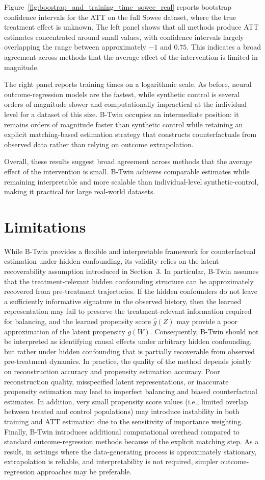 \documentclass[10pt]{article} %
\begin{document}
Figure~\ref{fig:boostrap_and_training_time_sowee_real} reports bootstrap confidence intervals for the ATT on the full Sowee dataset, where the true treatment effect is unknown. The left panel shows that all methods produce ATT estimates concentrated around small values, with confidence intervals largely overlapping the range between approximately $-1$ and $0.75$. This indicates a broad agreement across methods that the average effect of the intervention is limited in magnitude.

The right panel reports training times on a logarithmic scale. As before, neural outcome-regression models are the fastest, while synthetic control is several orders of magnitude slower and computationally impractical at the individual level for a dataset of this size. B-Twin occupies an intermediate position: it remains orders of magnitude faster than synthetic control while retaining an explicit matching-based estimation strategy that constructs counterfactuals from observed data rather than relying on outcome extrapolation.

Overall, these results suggest broad agreement across methods that the average
effect of the intervention is small. B-Twin achieves comparable
estimates while remaining interpretable and more scalable than {individual-level} synthetic-control, making it practical for
large real-world datasets.
\section{{Limitations}}
{
While B-Twin provides a flexible and interpretable framework for counterfactual estimation under hidden confounding, its validity relies on the latent recoverability assumption introduced in Section~3. In particular, B-Twin assumes that the treatment-relevant hidden confounding structure can be approximately recovered from pre-treatment trajectories. If the hidden confounders do not leave a sufficiently informative signature in the observed history, then the learned representation may fail to preserve the treatment-relevant information required for balancing, and the learned propensity score $\hat g(Z)$ may provide a poor approximation of the latent propensity $g(W)$. Consequently, B-Twin should not be interpreted as identifying causal effects under arbitrary hidden confounding, but rather under hidden confounding that is partially recoverable from observed pre-treatment dynamics.
In practice, the quality of the method depends jointly on reconstruction accuracy and propensity estimation accuracy. Poor reconstruction quality, misspecified latent representations, or inaccurate propensity estimation may lead to imperfect balancing and biased counterfactual estimates. In addition, very small propensity score values (i.e., limited overlap between treated and control populations) may introduce instability in both training and ATT estimation due to the sensitivity of importance weighting.
Finally, B-Twin introduces additional computational overhead compared to standard outcome-regression methods because of the explicit matching step. As a result, in settings where the data-generating process is approximately stationary, extrapolation is reliable, and interpretability is not required, simpler outcome-regression approaches may be preferable.
}
\end{document}
